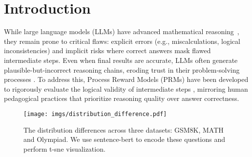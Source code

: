 \section{Introduction}


While large language models (LLMs) have advanced mathematical reasoning~\cite{openai2023gpt,dubey2024llama,zhu2024deepseek,shao2024deepseekmath,yang2024qwen2}, they remain prone to critical flaws: explicit errors (e.g., miscalculations, logical inconsistencies) and implicit risks where correct answers mask flawed intermediate steps. Even when final results are accurate, LLMs often generate plausible-but-incorrect reasoning chains, eroding trust in their problem-solving processes \cite{lightman2023let}. To address this, Process Reward Models (PRMs) \cite{lightman2023let,wang2024math} have been developed to rigorously evaluate the logical validity of intermediate steps \cite{gsm8k}, mirroring human pedagogical practices that prioritize reasoning quality over answer correctness.


\begin{figure}[t]
  \centering
  \vspace{-10pt}
  \texttt{[image: imgs/distribution\_difference.pdf]}
  \vspace{-20pt}
  \caption{The distribution differences across three datasets: GSM8K, MATH and Olympiad. We use sentence-bert to encode these questions and perform t-sne visualization.}
  \label{fig: question OOD}
  \vspace{-20pt}
\end{figure}


